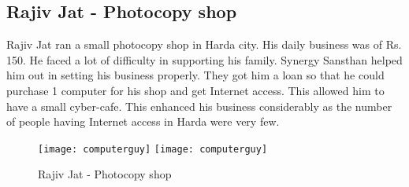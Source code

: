 \subsection{Rajiv Jat - Photocopy shop}
Rajiv Jat ran a small photocopy shop in Harda city. His daily business was of Rs. 150. He faced a lot of difficulty in supporting his family. Synergy Sansthan helped him out in setting his business properly. They got him a loan so that he could purchase 1 computer for his shop and get Internet access. This allowed him to have a small cyber-cafe. This enhanced his business considerably as the number of people having Internet access in Harda were very few.


\begin{figure}[ht!]
  \begin{center}
    \leavevmode
    \ifpdf
      \texttt{[image: computerguy]}
    \else
      \texttt{[image: computerguy]}
    \fi
    \caption{Rajiv Jat - Photocopy shop}
    \label{FigAir}
  \end{center}
\end{figure}



